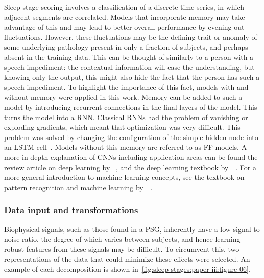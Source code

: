 Sleep stage scoring involves a classification of a discrete time-series, in which adjacent segments are correlated. 
Models that incorporate memory may take advantage of this and may lead to better overall performance by evening out fluctuations. 
However, these fluctuations may be the defining trait or anomaly of some underlying pathology present in only a fraction of subjects, and perhaps absent in the training data. 
This can be thought of similarly to a person with a speech impediment: the contextual information will ease the understanding, but knowing only the output, this might also hide the fact that the person has such a speech impediment. 
To highlight the importance of this fact, models with and without memory were applied in this work. 
Memory can be added to such a model by introducing recurrent connections in the final layers of the model. 
This turns the model into a \ac{RNN}. 
Classical \acp{RNN} had the problem of vanishing or exploding gradients, which meant that optimization was very difficult.
This problem was solved by changing the configuration of the simple hidden node into an \ac{LSTM} cell~\cite{Hochreiter1997}.
Models without this memory are referred to as FF models. 
A more in-depth explanation of \acp{CNN} including application areas can be found the review article on deep learning by \citeauthor{LeCun2015}~\cite{LeCun2015}, and the deep learning textbook by~\citeauthor{Goodfellow2016}~\cite{Goodfellow2016}. 
For a more general introduction to machine learning concepts, see the textbook on pattern recognition and machine learning by~\citeauthor{Bishop2006}~\cite{Bishop2006}.

\subsubsection{Data input and transformations}
Biophysical signals, such as those found in a \ac{PSG}, inherently have a low signal to noise ratio, the degree of which varies between subjects, and hence learning robust features from these signals may be difficult. 
To circumvent this, two representations of the data that could minimize these effects were selected. 
An example of each decomposition is shown in~\cref{fig:sleep-stages:paper-iii:figure-06}.

